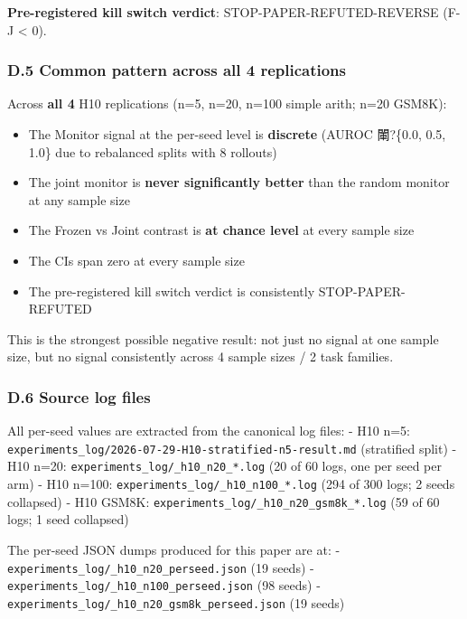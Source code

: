 \documentclass[
]{article}
\providecommand{\tightlist}{%
  \setlength{\itemsep}{0pt}\setlength{\parskip}{0pt}}
\begin{document}
\textbf{Pre-registered kill switch verdict}: STOP-PAPER-REFUTED-REVERSE
(F-J \textless{} 0).

\subsubsection{D.5 Common pattern across all 4
replications}\label{d.5-common-pattern-across-all-4-replications}

Across \textbf{all 4} H10 replications (n=5, n=20, n=100 simple arith;
n=20 GSM8K):

\begin{itemize}
\tightlist
\item
  The Monitor signal at the per-seed level is \textbf{discrete} (AUROC
  閳?\{0.0, 0.5, 1.0\} due to rebalanced splits with 8 rollouts)
\item
  The joint monitor is \textbf{never significantly better} than the
  random monitor at any sample size
\item
  The Frozen vs Joint contrast is \textbf{at chance level} at every
  sample size
\item
  The CIs span zero at every sample size
\item
  The pre-registered kill switch verdict is consistently
  STOP-PAPER-REFUTED
\end{itemize}

This is the strongest possible negative result: not just no signal at
one sample size, but no signal consistently across 4 sample sizes / 2
task families.

\subsubsection{D.6 Source log files}\label{d.6-source-log-files}

All per-seed values are extracted from the canonical log files: - H10
n=5: \texttt{experiments\_log/2026-07-29-H10-stratified-n5-result.md}
(stratified split) - H10 n=20:
\texttt{experiments\_log/\_h10\_n20\_*.log} (20 of 60 logs, one per seed
per arm) - H10 n=100: \texttt{experiments\_log/\_h10\_n100\_*.log} (294
of 300 logs; 2 seeds collapsed) - H10 GSM8K:
\texttt{experiments\_log/\_h10\_n20\_gsm8k\_*.log} (59 of 60 logs; 1
seed collapsed)

The per-seed JSON dumps produced for this paper are at: -
\texttt{experiments\_log/\_h10\_n20\_perseed.json} (19 seeds) -
\texttt{experiments\_log/\_h10\_n100\_perseed.json} (98 seeds) -
\texttt{experiments\_log/\_h10\_n20\_gsm8k\_perseed.json} (19 seeds)
\end{document}
